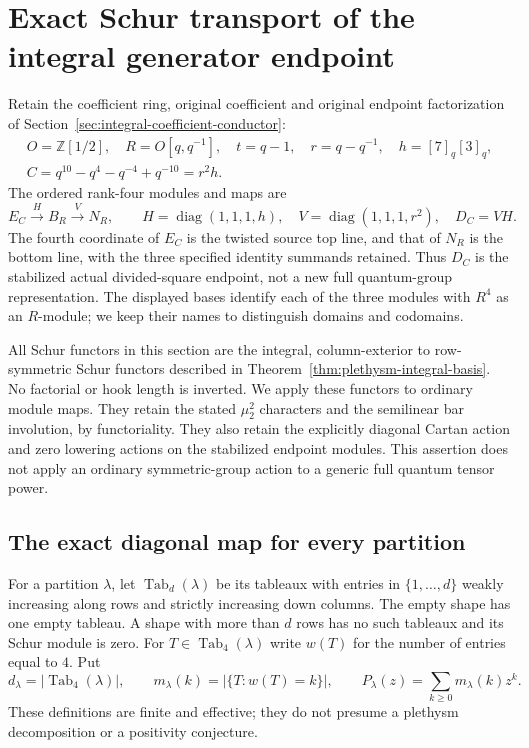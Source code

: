 \section{Exact Schur transport of the integral generator endpoint}
\label{sec:plethysm-endpoint-transport}

Retain the coefficient ring, original coefficient and original endpoint
factorization of Section~\ref{sec:integral-coefficient-conductor}:
\begin{gather*}
 O=\mathbb Z[1/2],\quad R=O[q,q^{-1}],\quad t=q-1,\quad
 r=q-q^{-1},\quad h=[7]_q[3]_q,\\
 C=q^{10}-q^4-q^{-4}+q^{-10}=r^2h.
\end{gather*}
The ordered rank-four modules and maps are
\[
 E_C\xrightarrow{H}B_R\xrightarrow{V}N_R,\qquad
 H=\operatorname{diag}(1,1,1,h),\quad
 V=\operatorname{diag}(1,1,1,r^2),\quad D_C=VH.
\]
The fourth coordinate of $E_C$ is the twisted source top line,
and that of $N_R$ is the bottom line, with the three specified identity
summands retained. Thus $D_C$ is the stabilized actual divided-square
endpoint, not a new full quantum-group representation. The displayed
bases identify each of the three modules with $R^4$ as an $R$-module;
we keep their names to distinguish domains and codomains.

All Schur functors in this section are the integral, column-exterior to
row-symmetric Schur functors described in
Theorem~\ref{thm:plethysm-integral-basis}. No factorial or hook
length is inverted. We apply these functors to ordinary module maps.
They retain the stated $\mu_2^2$ characters and the semilinear bar
involution, by functoriality. They also retain the explicitly diagonal
Cartan action and zero lowering actions on the stabilized endpoint
modules. This assertion does not apply an ordinary symmetric-group
action to a generic full quantum tensor power.

\subsection{The exact diagonal map for every partition}

For a partition $\lambda$, let $\operatorname{Tab}_d(\lambda)$ be its
tableaux with entries in $\{1,\ldots,d\}$ weakly increasing along rows
and strictly increasing down columns. The empty shape has one empty
tableau. A shape with more than $d$ rows has no such tableaux and its
Schur module is zero. For $T\in\operatorname{Tab}_4(\lambda)$ write
$w(T)$ for the number of entries equal to $4$. Put
\[
 d_\lambda=|\operatorname{Tab}_4(\lambda)|,\qquad
 m_\lambda(k)=|\{T:w(T)=k\}|,
 \qquad P_\lambda(z)=\sum_{k\ge0}m_\lambda(k)z^k.
\]
These definitions are finite and effective; they do not presume a
plethysm decomposition or a positivity conjecture.

